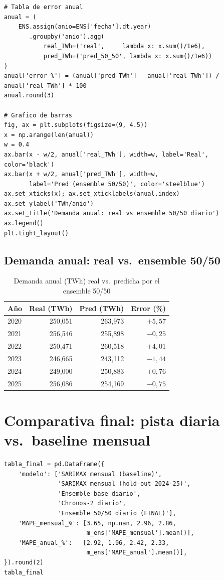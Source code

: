 \documentclass[12pt,a4paper]{article}
\begin{document}
\begin{lstlisting}[caption={Demanda anual real vs.\ predicha + gráfico de barras}]
# Tabla de error anual
anual = (
    ENS.assign(anio=ENS['fecha'].dt.year)
       .groupby('anio').agg(
           real_TWh=('real',     lambda x: x.sum()/1e6),
           pred_TWh=('pred_50_50', lambda x: x.sum()/1e6))
)
anual['error_%'] = (anual['pred_TWh'] - anual['real_TWh']) / anual['real_TWh'] * 100
anual.round(3)

# Grafico de barras
fig, ax = plt.subplots(figsize=(9, 4.5))
x = np.arange(len(anual))
w = 0.4
ax.bar(x - w/2, anual['real_TWh'], width=w, label='Real', color='black')
ax.bar(x + w/2, anual['pred_TWh'], width=w,
       label='Pred (ensemble 50/50)', color='steelblue')
ax.set_xticks(x); ax.set_xticklabels(anual.index)
ax.set_ylabel('TWh/anio')
ax.set_title('Demanda anual: real vs ensemble 50/50 diario')
ax.legend()
plt.tight_layout()
\end{lstlisting}

\subsection*{Demanda anual: real vs.\ ensemble 50/50}

\begin{table}[H]
\centering
\caption{Demanda anual (TWh) real vs.\ predicha por el ensemble 50/50}
\begin{tabular}{lrrr}
\toprule
Año & Real (TWh) & Pred (TWh) & Error (\%) \\
\midrule
2020 & 250{,}051 & 263{,}973 & $+5{,}57$ \\
2021 & 256{,}546 & 255{,}898 & $-0{,}25$ \\
2022 & 250{,}471 & 260{,}518 & $+4{,}01$ \\
2023 & 246{,}665 & 243{,}112 & $-1{,}44$ \\
2024 & 249{,}000 & 250{,}883 & $+0{,}76$ \\
2025 & 256{,}086 & 254{,}169 & $-0{,}75$ \\
\bottomrule
\end{tabular}
\end{table}

\section{Comparativa final: pista diaria vs.\ baseline mensual}

\begin{lstlisting}[caption={Tabla comparativa global de todos los modelos}]
tabla_final = pd.DataFrame({
    'modelo': ['SARIMAX mensual (baseline)',
               'SARIMAX mensual (hold-out 2024-25)',
               'Ensemble base diario',
               'Chronos-2 diario',
               'Ensemble 50/50 diario (FINAL)'],
    'MAPE_mensual_%': [3.65, np.nan, 2.96, 2.86,
                       m_ens['MAPE_mensual'].mean()],
    'MAPE_anual_%':   [2.92, 1.96, 2.42, 2.33,
                       m_ens['MAPE_anual'].mean()],
}).round(2)
tabla_final
\end{lstlisting}
\end{document}
